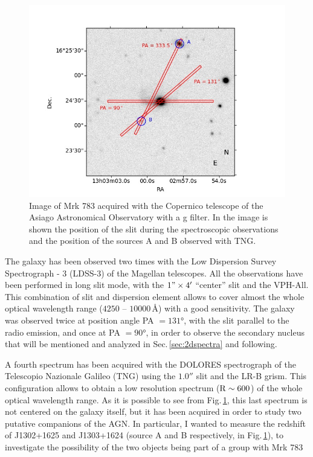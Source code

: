 \documentclass[../main.tex]{subfiles}
\begin{document}
\begin{figure}
\centering
\includegraphics[width=1.2\textwidth]{images/paper3/finding.jpg} 
\caption[]{Image of Mrk 783 acquired with the Copernico telescope of the Asiago Astronomical Observatory with a g filter. In the image is shown the position of the slit during the spectroscopic observations and the position of the sources A and B observed with TNG.}
\label{fig:finding_chart}
\end{figure}

The galaxy has been observed two times with the Low Dispersion Survey Spectrograph - 3 (LDSS-3) of the Magellan telescopes.
All the observations have been performed in long slit mode, with the $1"\times4'$ ``center'' slit and the VPH-All.
This combination of slit and dispersion element allows to cover almost the whole optical wavelength range ($4250$ -- $10000\,\si{\angstrom}$) with a good sensitivity.
The galaxy was observed twice at position angle PA $=\ang{131}$, with the slit parallel to the radio emission, and once at PA $=\ang{90}$, in order to observe the secondary nucleus that will be mentioned and analyzed in Sec.\,\ref{sec:2dspectra} and following.

A fourth spectrum has been acquired with the DOLORES spectrograph of the Telescopio Nazionale Galileo (TNG) using the $1.0''$ slit and the LR-B grism.
This configuration allows to obtain a low resolution spectrum (${\rm R}\sim 600$) of the whole optical wavelength range.
As it is possible to see from Fig.\,\ref{fig:finding_chart}, this last spectrum is not centered on the galaxy itself, but it has been acquired in order to study two putative companions of the AGN.
In particular, I wanted to measure the redshift of J1302+1625 and J1303+1624 (source A and B respectively, in Fig.\,\ref{fig:finding_chart}), to investigate the possibility of the two objects being part of a group with Mrk 783
\end{document}
